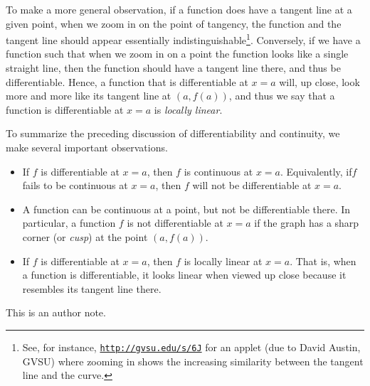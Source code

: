 To make a more general observation, if a function does have a tangent line at a given point, when we zoom in on the point of tangency, the function and the tangent line should appear essentially indistinguishable\footnote{See, for instance, \href{http://gvsu.edu/s/6J}{\texttt{http://gvsu.edu/s/6J}} for an applet (due to David Austin, GVSU) where zooming in shows the increasing similarity between the tangent line and the curve.  }.  Conversely, if we have a function such that when we zoom in on a point the function looks like a single straight line, then the function should have a tangent line there, and thus be differentiable.  Hence, a function that is differentiable at $x = a$ will, up close, look more and more like its tangent line at $(a,f(a))$, and thus we say that a function is differentiable at $x = a$ is \emph{locally linear}. 


To summarize the preceding discussion of differentiability and continuity, we make several important observations.
\begin{itemize}
	\item If $f$ is differentiable at $x = a$, then $f$ is continuous at $x = a$.  Equivalently, if$f$ fails to be continuous at $x = a$, then $f$ will not be differentiable at $x = a$.  
	\item A function can be continuous at a point, but not be differentiable there.  In particular, a function $f$ is not differentiable at $x = a$ if the graph has a sharp corner (or \emph{cusp})  at the point $(a,f(a))$.  
	\item If $f$ is differentiable at $x = a$, then $f$ is locally linear at $x = a$.  That is, when a function is differentiable, it looks linear when viewed up close because it resembles its tangent line there.
\end{itemize}

\newpage




\begin{authornote}
This is an author note.
\end{authornote}

